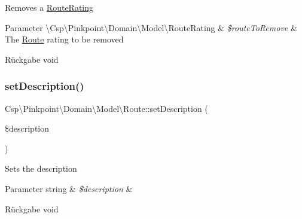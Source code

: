 Removes a \hyperlink{classCsp_1_1Pinkpoint_1_1Domain_1_1Model_1_1RouteRating}{Route\+Rating}


\begin{DoxyParams}[1]{Parameter}
\textbackslash{}\+Csp\textbackslash{}\+Pinkpoint\textbackslash{}\+Domain\textbackslash{}\+Model\textbackslash{}\+Route\+Rating & {\em \$route\+To\+Remove} & The \hyperlink{classCsp_1_1Pinkpoint_1_1Domain_1_1Model_1_1Route}{Route} rating to be removed \\
\hline
\end{DoxyParams}
\begin{DoxyReturn}{Rückgabe}
void 
\end{DoxyReturn}
\mbox{\label{classCsp_1_1Pinkpoint_1_1Domain_1_1Model_1_1Route_a9e3d11bc75920ed92278ff171df1618a}} 
\subsubsection{\texorpdfstring{set\+Description()}{setDescription()}}
{\footnotesize\ttfamily Csp\textbackslash{}\+Pinkpoint\textbackslash{}\+Domain\textbackslash{}\+Model\textbackslash{}\+Route\+::set\+Description (\begin{DoxyParamCaption}\item[{}]{\$description }\end{DoxyParamCaption})}

Sets the description


\begin{DoxyParams}[1]{Parameter}
string & {\em \$description} & \\
\hline
\end{DoxyParams}
\begin{DoxyReturn}{Rückgabe}
void 
\end{DoxyReturn}
\mbox{\label{classCsp_1_1Pinkpoint_1_1Domain_1_1Model_1_1Route_aa066f9311a0100fa19e47e8ab8aa0b75}} 
